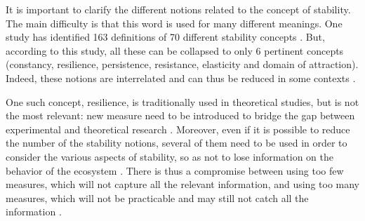 \documentclass{article}
\begin{document}
It is important to clarify the different notions related to the concept of stability. The main difficulty is that this word is used for many different meanings. One study has identified 163 definitions of 70 different stability concepts \cite{grimm1997babel}.%
But, according to this study, all these can be collapsed to only 6 pertinent concepts (constancy, resilience, persistence, resistance, elasticity and domain of attraction). Indeed, these notions are interrelated and can thus be reduced in some contexts \cite{donohue2013dimensionality}.

One such concept, resilience, is traditionally used in theoretical studies, but is not the most relevant: new measure need to be introduced to bridge the gap between experimental and theoretical research \cite{arnoldi2016resilience} \cite{gunderson2000ecological} \cite{neubert_alternatives_1997}.
Moreover, even if it is possible to reduce the number of the stability notions, several of them need to be used in order to consider the various aspects of stability, so as not to lose information on the behavior of the ecosystem \cite{derissen_relationship_2011}. There is thus a compromise between using too few measures, which will not capture all the relevant information, and using too many measures, which will not be practicable and may still not catch all the information \cite{hillebrand2018decomposing}.







\paragraph{}
\end{document}
